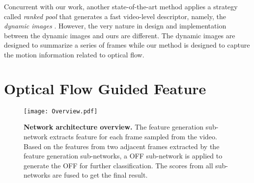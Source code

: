 \documentclass[10pt,twocolumn,letterpaper]{article}
\begin{document}
Concurrent with our work, another state-of-the-art method applies a strategy called \textit{ranked pool} \cite{fernando2017rankpool} that generates a fast video-level descriptor, namely, the \textit{dynamic images} \cite{bilen2016dynamic}. However, the very nature in design and implementation between the dynamic images and ours are different. The dynamic images are designed to summarize a series of frames while our method is designed to capture the motion information related to optical flow.

















\section{Optical Flow Guided Feature}

\begin{figure}[t]
\texttt{[image: Overview.pdf]}
\caption{\textbf{Network architecture overview.} The feature generation sub-network extracts feature for each frame sampled from the video. Based on the features from two adjacent frames extracted by the feature generation sub-networks, a OFF sub-network is applied to generate the OFF for further classification. The scores from all sub-networks are fused to get the final result.}
\label{fig:overview_arch}
\end{figure}


\label{sec:method}
\end{document}

